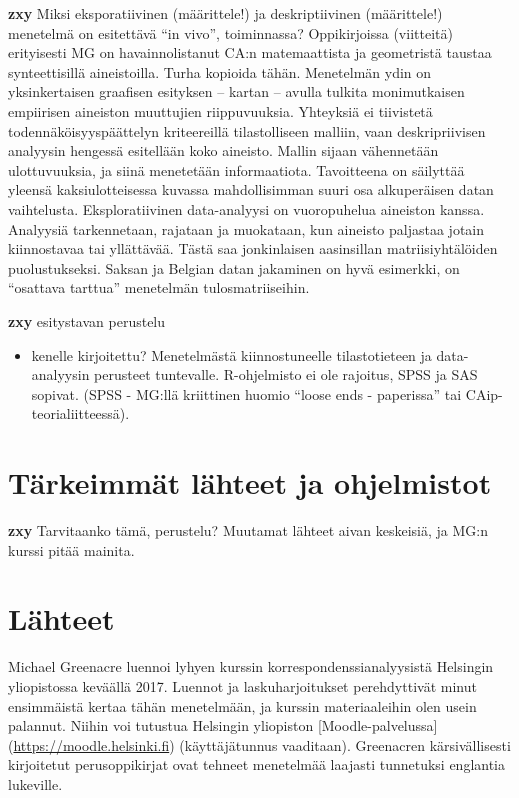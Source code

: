 \documentclass[finnish,]{book}
\providecommand{\tightlist}{%
  \setlength{\itemsep}{0pt}\setlength{\parskip}{0pt}}
\theoremstyle{definition}
\theoremstyle{definition}
\theoremstyle{definition}
\theoremstyle{remark}
\begin{document}
\textbf{zxy} Miksi eksporatiivinen (määrittele!) ja deskriptiivinen
(määrittele!) menetelmä on esitettävä ``in vivo'', toiminnassa?
Oppikirjoissa (viitteitä) erityisesti MG on havainnolistanut CA:n
matemaattista ja geometristä taustaa synteettisillä aineistoilla. Turha
kopioida tähän. Menetelmän ydin on yksinkertaisen graafisen esityksen --
kartan -- avulla tulkita monimutkaisen empiirisen aineiston muuttujien
riippuvuuksia. Yhteyksiä ei tiivistetä todennäköisyyspäättelyn
kriteereillä tilastolliseen malliin, vaan deskripriivisen analyysin
hengessä esitellään koko aineisto. Mallin sijaan vähennetään
ulottuvuuksia, ja siinä menetetään informaatiota. Tavoitteena on
säilyttää yleensä kaksiulotteisessa kuvassa mahdollisimman suuri osa
alkuperäisen datan vaihtelusta. Eksploratiivinen data-analyysi on
vuoropuhelua aineiston kanssa. Analyysiä tarkennetaan, rajataan ja
muokataan, kun aineisto paljastaa jotain kiinnostavaa tai yllättävää.
Tästä saa jonkinlaisen aasinsillan matriisiyhtälöiden puolustukseksi.
Saksan ja Belgian datan jakaminen on hyvä esimerkki, on ``osattava
tarttua'' menetelmän tulosmatriiseihin.

\textbf{zxy} esitystavan perustelu

\begin{itemize}
\tightlist
\item
  kenelle kirjoitettu? Menetelmästä kiinnostuneelle tilastotieteen ja
  data-analyysin perusteet tuntevalle. R-ohjelmisto ei ole rajoitus,
  SPSS ja SAS sopivat. (SPSS - MG:llä kriittinen huomio ``loose ends -
  paperissa'' tai CAip-teorialiitteessä).
\end{itemize}

\hypertarget{tarkeimmat-lahteet-ja-ohjelmistot}{%
\section{Tärkeimmät lähteet ja
ohjelmistot}\label{tarkeimmat-lahteet-ja-ohjelmistot}}

\textbf{zxy} Tarvitaanko tämä, perustelu? Muutamat lähteet aivan
keskeisiä, ja MG:n kurssi pitää mainita.

\hypertarget{lahteet}{%
\section{Lähteet}\label{lahteet}}

Michael Greenacre luennoi lyhyen kurssin korrespondenssianalyysistä
Helsingin yliopistossa keväällä
2017\citep{RefWorks:doc:5b6ef091e4b0984fd9b8c0ca}. Luennot ja
laskuharjoitukset perehdyttivät minut ensimmäistä kertaa tähän
menetelmään, ja kurssin materiaaleihin olen usein palannut. Niihin voi
tutustua Helsingin yliopiston {[}Moodle-palvelussa{]}
(\url{https://moodle.helsinki.fi}) (käyttäjätunnus vaaditaan).
Greenacren kärsivällisesti kirjoitetut perusoppikirjat ovat tehneet
menetelmää laajasti tunnetuksi englantia lukeville.
\end{document}
